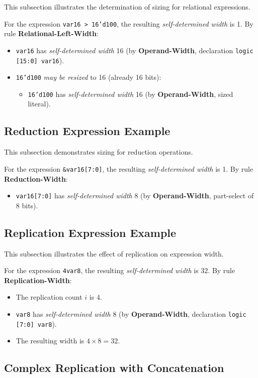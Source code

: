 \documentclass{article}
\newcommand{\sv}[1]{\texttt{#1}}
\newcommand{\sds}{\emph{self-determined width}}
\newcommand{\mbr}{\emph{may be resized}}
\begin{document}
This subsection illustrates the determination of sizing for relational
expressions.

For the expression \sv{var16 > 16'd100}, the resulting \sds{} is 1.
By rule \textbf{Relational-Left-Width}:
\begin{itemize}
  \item \sv{var16} has \sds{} 16 (by \textbf{Operand-Width},
    declaration \sv{logic [15:0] var16}).
  \item \sv{16'd100} \mbr{} to 16 (already 16 bits):
    \begin{itemize}
      \item \sv{16'd100} has \sds{} 16 (by
        \textbf{Operand-Width}, sized literal).
    \end{itemize}
\end{itemize}

\subsection{Reduction Expression Example}

This subsection demonstrates sizing for reduction operations.

For the expression \sv{&var16[7:0]}, the resulting \sds{} is 1.
By rule \textbf{Reduction-Width}:
\begin{itemize}
  \item \sv{var16[7:0]} has \sds{} 8 (by
    \textbf{Operand-Width}, part-select of 8 bits).
\end{itemize}

\subsection{Replication Expression Example}

This subsection illustrates the effect of replication on expression
width.

For the expression \sv{{4{var8}}}, the resulting \sds{} is 32.
By rule \textbf{Replication-Width}:
\begin{itemize}
  \item The replication count $i$ is 4.
  \item \sv{var8} has \sds{} 8 (by \textbf{Operand-Width},
    declaration \sv{logic [7:0] var8}).
  \item The resulting width is $4 \times 8 = 32$.
\end{itemize}

\subsection{Complex Replication with Concatenation}
\end{document}
